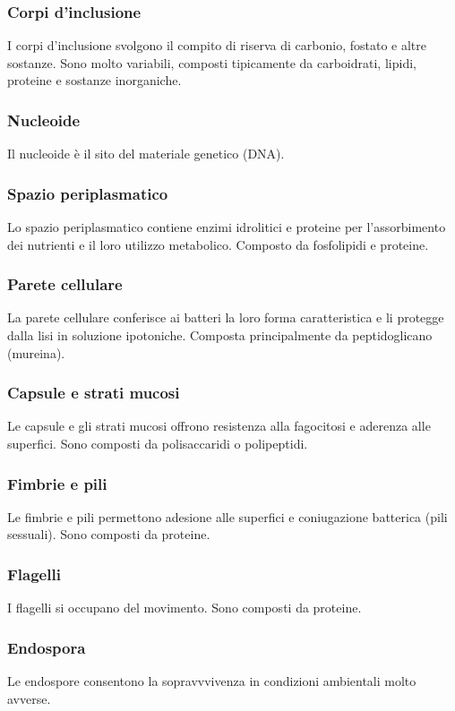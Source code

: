 \subsubsection{Corpi d'inclusione}
I corpi d'inclusione svolgono il compito di riserva di carbonio, fostato e altre sostanze. Sono molto variabili, composti tipicamente da carboidrati, 
lipidi, proteine e sostanze inorganiche.
\subsubsection{Nucleoide}
Il nucleoide \`e il sito del materiale genetico (DNA).
\subsubsection{Spazio periplasmatico}
Lo spazio periplasmatico contiene enzimi idrolitici e proteine per l'assorbimento dei nutrienti e il loro utilizzo metabolico. Composto da fosfolipidi e 
proteine. 
\subsubsection{Parete cellulare}
La parete cellulare conferisce ai batteri la loro forma caratteristica e li protegge dalla lisi in soluzione ipotoniche. Composta principalmente da 
peptidoglicano (mureina).
\subsubsection{Capsule e strati mucosi}
Le capsule e gli strati mucosi offrono resistenza alla fagocitosi e aderenza alle superfici. Sono composti da polisaccaridi o polipeptidi. 
\subsubsection{Fimbrie e pili}
Le fimbrie e pili permettono adesione alle superfici e coniugazione batterica (pili sessuali). Sono composti da proteine.
\subsubsection{Flagelli}
I flagelli si occupano del movimento. Sono composti da proteine.
\subsubsection{Endospora}
Le endospore consentono la sopravvvivenza in condizioni ambientali molto avverse. 
